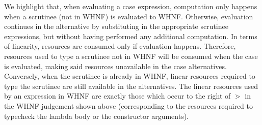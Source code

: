 \documentclass[acmsmall,review,anonymous]{acmart}
\begin{document}
We highlight that, when evaluating a case expression, computation only
happens when a scrutinee (not in WHNF) is evaluated to
WHNF. Otherwise, evaluation continues in the alternative by
substituting in the appropriate scrutinee expressions, but without
having performed any additional computation.
%
In terms of linearity, resources are consumed only if evaluation happens.
Therefore, resources used to type a scrutinee not in
WHNF will be consumed when the case is evaluated, making said resources unavailable in the case
alternatives. Conversely, when the scrutinee is already in WHNF, linear
resources required to type the scrutinee are still available in the alternatives.
The linear resources used by an expression in WHNF are exactly those which
occur to the right of $\gtrdot$ in the WHNF judgement shown above
(corresponding to the resources required to typecheck the lambda body or the
constructor arguments).

%
%
%
%
%


\end{document}

